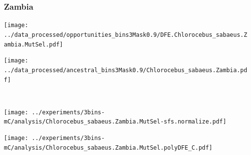 \subsubsection{Zambia}

\begin{minipage}{0.49\linewidth}
    \texttt{[image: ../data\_processed/opportunities\_bins3Mask0.9/DFE.Chlorocebus\_sabaeus.Zambia.MutSel.pdf]}
\end{minipage}
\begin{minipage}{0.49\linewidth}
    \texttt{[image: ../data\_processed/ancestral\_bins3Mask0.9/Chlorocebus\_sabaeus.Zambia.pdf]}
\end{minipage}
\\
\begin{minipage}{0.49\linewidth}
    \texttt{[image: ../experiments/3bins-mC/analysis/Chlorocebus\_sabaeus.Zambia.MutSel-sfs.normalize.pdf]}
\end{minipage}
\begin{minipage}{0.4\linewidth}
    \texttt{[image: ../experiments/3bins-mC/analysis/Chlorocebus\_sabaeus.Zambia.MutSel.polyDFE\_C.pdf]}
\end{minipage}
